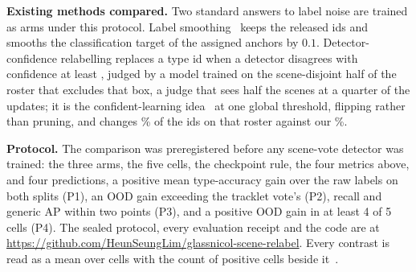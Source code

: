 \documentclass{article}
\begin{document}
\noindent\textbf{Existing methods compared.} Two standard answers to label noise are trained as arms under this protocol. Label smoothing~\cite{muller2019labelsmoothing} keeps the released ids and smooths the classification target of the assigned anchors by $0.1$. Detector-confidence relabelling replaces a type id when a detector disagrees with confidence at least \ConfidConf, judged by a model trained on the scene-disjoint half of the roster that excludes that box, a judge that sees half the scenes at a quarter of the updates; it is the confident-learning idea~\cite{northcutt2021confident,chachula2026clod} at one global threshold, flipping rather than pruning, and changes \ConfidChangedPct\% of the ids on that roster against our \SceneChangedRosterPct\%.

\noindent\textbf{Protocol.} The comparison was preregistered before any scene-vote detector was trained: the three arms, the five cells, the checkpoint rule, the four metrics above, and four predictions, a positive mean type-accuracy gain over the raw labels on both splits (P1), an OOD gain exceeding the tracklet vote's (P2), recall and generic AP within two points (P3), and a positive OOD gain in at least 4 of 5 cells (P4). The sealed protocol, every evaluation receipt and the code are at \url{https://github.com/HeunSeungLim/glassnicol-scene-relabel}. Every contrast is read as a mean over cells with the count of positive cells beside it~\cite{bouthillier2021variance}.
\end{document}
